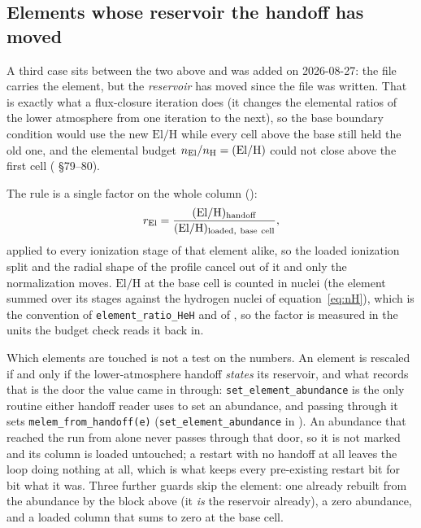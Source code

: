 \documentclass[english,a4paper]{my_memo}
\begin{document}
\subsection{Elements whose reservoir the handoff has moved}
\label{sec:handoff-rescale}

A third case sits between the two above and was added on 2026-08-27: the
file carries the element, but the \emph{reservoir} has moved since the file
was written. That is exactly what a flux-closure iteration does (it
changes the elemental ratios of the lower atmosphere from one iteration to
the next), so the base boundary condition would use the new $\mathrm{El/H}$
while every cell above the base still held the old one, and the elemental
budget $n_{\rm El}/n_{\rm H} = (\mathrm{El/H})$ could not close above the
first cell ( \S79--80).

The rule is a single factor on the whole column
():
%
\begin{equation}
  r_{\rm El} = \frac{(\mathrm{El/H})_{\rm handoff}}
                    {(\mathrm{El/H})_{\rm loaded,\ base\ cell}},
  \label{eq:rel}
\end{equation}
%
applied to every ionization stage of that element alike, so the loaded
ionization split and the radial shape of the profile cancel out of it and
only the normalization moves. $\mathrm{El/H}$ at the base cell is counted in
nuclei (the element summed over its stages against the hydrogen nuclei of
equation~\eqref{eq:nH}), which is the convention of
\verb|element_ratio_HeH| and of , so the
factor is measured in the units the budget check reads it back in.

Which elements are touched is not a test on the numbers. An element is
rescaled if and only if the lower-atmosphere handoff \emph{states} its
reservoir, and what records that is the door the value came in through:
\verb|set_element_abundance| is the only routine either handoff reader uses
to set an abundance, and passing through it sets
\verb|melem_from_handoff(e)| (\verb|set_element_abundance| in
). An abundance that
reached the run from  alone never passes through that door,
so it is not marked and its column is loaded untouched; a restart with no
handoff at all leaves the loop doing nothing at all, which is what keeps
every pre-existing restart bit for bit what it was. Three further guards
skip the element: one already rebuilt from the abundance by the block above
(it \emph{is} the reservoir already), a zero abundance, and a loaded column
that sums to zero at the base cell.
\end{document}
